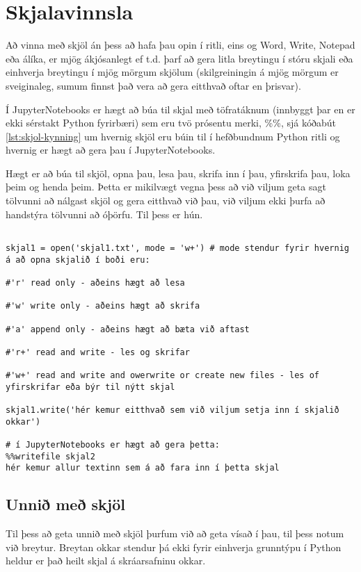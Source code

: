 
\chapter{Skjalavinnsla}\label{k:skjalavinnsla}
Að vinna með skjöl án þess að hafa þau opin í ritli, eins og Word, Write, Notepad eða álíka, er mjög ákjósanlegt ef t.d. þarf að gera litla breytingu í stóru skjali eða einhverja breytingu í mjög mörgum skjölum (skilgreiningin á mjög mörgum er sveiginaleg, sumum finnst það vera að gera eitthvað oftar en þrisvar).

Í JupyterNotebooks er hægt að búa til skjal með töfratáknum (innbyggt þar en er ekki sérstakt Python fyrirbæri) sem eru tvö prósentu merki, \%\%, sjá kóðabút \ref{lst:skjol-kynning} um hvernig skjöl eru búin til í hefðbundnum Python ritli og hvernig er hægt að gera þau í JupyterNotebooks.

Hægt er að búa til skjöl, opna þau, lesa þau, skrifa inn í þau, yfirskrifa þau, loka þeim og henda þeim.
Þetta er mikilvægt vegna þess að við viljum geta sagt tölvunni að nálgast skjöl og gera eitthvað við þau, við viljum ekki þurfa að handstýra tölvunni að óþörfu.
Til þess er hún.

\begin{lstlisting}[caption=Hér sjáum við hvernig má búa til skjöl, label=lst:skjalavinnsla-kynning]
	
skjal1 = open('skjal1.txt', mode = 'w+') # mode stendur fyrir hvernig á að opna skjalið í boði eru:

#'r' read only - aðeins hægt að lesa

#'w' write only - aðeins hægt að skrifa

#'a' append only - aðeins hægt að bæta við aftast

#'r+' read and write - les og skrifar

#'w+' read and write and owerwrite or create new files - les of yfirskrifar eða býr til nýtt skjal

skjal1.write('hér kemur eitthvað sem við viljum setja inn í skjalið okkar')

# í JupyterNotebooks er hægt að gera þetta:
%%writefile skjal2
hér kemur allur textinn sem á að fara inn í þetta skjal
\end{lstlisting}

\section{Unnið með skjöl}\label{uk:skjalavinnsla-kynnt}
Til þess að geta unnið með skjöl þurfum við að geta vísað í þau, til þess notum við breytur.
Breytan okkar stendur þá ekki fyrir einhverja grunntýpu í Python heldur er það heilt skjal á skráarsafninu okkar.

